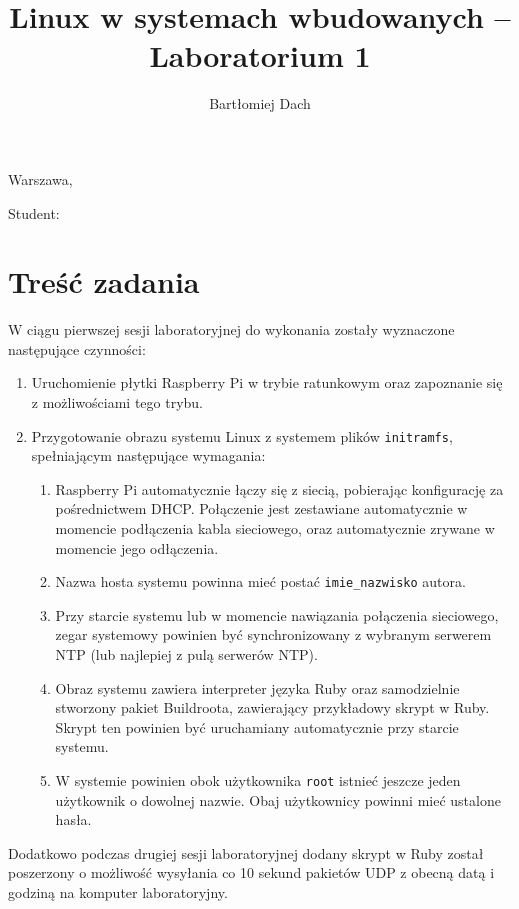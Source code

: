 \documentclass[10pt,a4paper]{article}
\title{Linux w systemach wbudowanych -- Laboratorium 1}
\author{Bartłomiej Dach}
\begin{document}
\makeatletter
\begin{flushright}
	Warszawa, \@date
\end{flushright}
\begin{center}
	\LARGE{\@title}
\end{center}
\vspace{0.25cm}
Student: \@author
\makeatother

\section{Treść zadania}

W ciągu pierwszej sesji laboratoryjnej do wykonania zostały wyznaczone następujące czynności:

\begin{enumerate}
	\item Uruchomienie płytki Raspberry Pi w trybie ratunkowym oraz zapoznanie się z możliwościami tego trybu.
	\item Przygotowanie obrazu systemu Linux z systemem plików \verb+initramfs+, spełniającym następujące wymagania:
	\begin{enumerate}
		\item Raspberry Pi automatycznie łączy się z siecią, pobierając konfigurację za pośrednictwem DHCP.
			Połączenie jest zestawiane automatycznie w momencie podłączenia kabla sieciowego, oraz automatycznie
			zrywane w momencie jego odłączenia.
		\item Nazwa hosta systemu powinna mieć postać \verb+imie_nazwisko+ autora.
		\item Przy starcie systemu lub w momencie nawiązania połączenia sieciowego, zegar systemowy powinien być 
			synchronizowany z wybranym serwerem NTP (lub najlepiej z pulą serwerów NTP).
		\item Obraz systemu zawiera interpreter języka Ruby oraz samodzielnie stworzony pakiet Buildroota, zawierający przykładowy
			skrypt w Ruby. Skrypt ten powinien być uruchamiany automatycznie przy starcie systemu.
		\item W systemie powinien obok użytkownika \verb+root+ istnieć jeszcze jeden użytkownik o dowolnej nazwie.
			Obaj użytkownicy powinni mieć ustalone hasła.
	\end{enumerate}
\end{enumerate}

Dodatkowo podczas drugiej sesji laboratoryjnej dodany skrypt w Ruby został poszerzony o możliwość wysyłania co 10 sekund pakietów UDP z obecną datą i godziną na komputer laboratoryjny.
\end{document}
